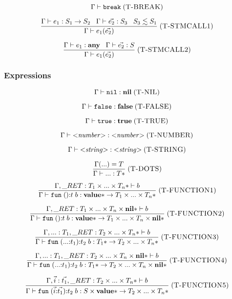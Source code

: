 \documentclass[12pt]{article}
\newcommand{\Top}{\mathbf{value}}
\newcommand{\Any}{\mathbf{any}}
\newcommand{\Nil}{\mathbf{nil}}
\newcommand{\False}{\mathbf{false}}
\newcommand{\True}{\mathbf{true}}
\newcommand{\kw}[1]{\mathbf{\texttt{#1}}}
\newcommand{\mylabel}[1]{\; (\textsc{#1})}
\newcommand{\env}{\Gamma}
\newcommand{\ret}{\string_RET}
\begin{document}
\[
\env \vdash \kw{break}
\mylabel{T-BREAK}
\]

\[
\frac{\env \vdash e_{1}:S_{1} \rightarrow S_{2} \;\;\;
      \env \vdash \vec{e_{2}}:S_{3} \;\;\;
      S_{3} \lesssim S_{1}}
     {\env \vdash e_{1}(\vec{e_{2}})}
\mylabel{T-STMCALL1}
\]

\[
\frac{\env \vdash e_{1}:\Any \;\;\;
      \env \vdash \vec{e_{2}}:S}
     {\env \vdash e_{1}(\vec{e_{2}})}
\mylabel{T-STMCALL2}
\]

\subsubsection{Expressions}

\[
\env \vdash \kw{nil} : \Nil
\mylabel{T-NIL}
\]

\[
\env \vdash \kw{false} : \False
\mylabel{T-FALSE}
\]

\[
\env \vdash \kw{true} : \True
\mylabel{T-TRUE}
\]

\[
\env \vdash {<}{\it number}{>} : {<}{\it number}{>}
\mylabel{T-NUMBER}
\]

\[
\env \vdash {<}{\it string}{>} : {<}{\it string}{>}
\mylabel{T-STRING}
\]

\[
\frac{\env({...}) = T}
     {\env \vdash {...} : T{*}}
\mylabel{T-DOTS}
\]

\[
\frac{\env, \ret:T_{1} \times ... \times T_{n}* \vdash b}
     {\env \vdash \kw{fun} \; (){:}t \; b :
      \Top{*} \rightarrow T_{1} \times ... \times T_{n}*}
\mylabel{T-FUNCTION1}
\]

\[
\frac{\env, \ret:T_{1} \times ... \times T_{n} \times \Nil{*} \vdash b}
     {\env \vdash \kw{fun} \; (){:}t \; b :
      \Top{*} \rightarrow T_{1} \times ... \times T_{n} \times \Nil{*}}
\mylabel{T-FUNCTION2}
\]

\[
\frac{\env, {...}:T_{1}, \ret:T_{2} \times ... \times T_{n}* \vdash b}
     {\env \vdash \kw{fun} \; ({...}{:}t_{1}){:}t_{2} \; b :
      T_{1}{*} \rightarrow T_{2} \times ... \times T_{n}*}
\mylabel{T-FUNCTION3}
\]

\[
\frac{\env, {...}:T_{1}, \ret:T_{2} \times ... \times T_{n} \times \Nil{*} \vdash b}
     {\env \vdash \kw{fun} \; ({...}{:}t_{1}){:}t_{2} \; b :
      T_{1}{*} \rightarrow T_{2} \times ... \times T_{n} \times \Nil{*}}
\mylabel{T-FUNCTION4}
\]

\[
\frac{\env, \vec{i}:\vec{t_{1}},
      \ret:T_{2} \times ... \times T_{n}* \vdash b}
     {\env \vdash \kw{fun} \; (\vec{i}{:}\vec{t_{1}}){:}t_{2} \; b :
      S \times \Top{*} \rightarrow T_{2} \times ... \times T_{n}*}
\mylabel{T-FUNCTION5}
\]
\end{document}
